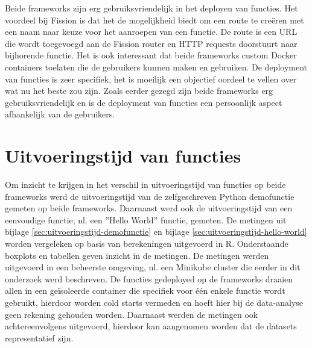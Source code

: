 Beide frameworks zijn erg gebruiksvriendelijk in het deployen van functies. Het voordeel bij Fission is dat het de mogelijkheid biedt om een route te creëren met een naam naar keuze voor het aanroepen van een functie. De route is een URL die wordt toegevoegd aan de Fission router en HTTP requests doorstuurt naar bijhorende functie. Het is ook interessant dat beide frameworks custom Docker containers toelaten die de gebruikers kunnen maken en gebruiken.
De deployment van functies is zeer specifiek, het is moeilijk een objectief oordeel te vellen over wat nu het beste zou zijn. Zoals eerder gezegd zijn beide frameworks erg gebruiksvriendelijk en is de deployment van functies een persoonlijk aspect afhankelijk van de gebruikers.

\section{Uitvoeringstijd van functies}
\label{sec:vergelijking-uitvoeringstijd}
Om inzicht te krijgen in het verschil in uitvoeringstijd van functies op beide frameworks werd de uitvoeringstijd van de zelfgeschreven Python demofunctie gemeten op beide frameworks. Daarnaast werd ook de uitvoeringstijd van een eenvoudige functie, nl. een ''Hello World'' functie, gemeten. De metingen uit bijlage \ref{sec:uitvoeringstijd-demofunctie} en bijlage \ref{sec:uitvoeringstijd-hello-world} worden vergeleken op basis van  berekeningen uitgevoerd in R. Onderstaande boxplots en tabellen geven inzicht in de metingen. De metingen werden uitgevoerd in een beheerste omgeving, nl. een Minikube cluster die eerder in dit onderzoek werd beschreven. De functies gedeployed op de frameworks draaien allen in een geïsoleerde container die specifiek voor één enkele functie wordt gebruikt, hierdoor worden cold starts vermeden en hoeft hier bij de data-analyse geen rekening gehouden worden. Daarnaast werden de metingen ook achtereenvolgens uitgevoerd, hierdoor kan aangenomen worden dat de datasets representatief zijn.

\newpage
